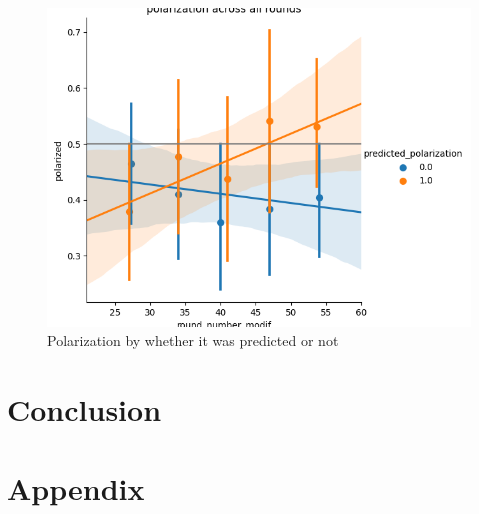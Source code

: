 \documentclass[
  12pt,
]{article}
\begin{document}
\begin{figure}

{\centering \includegraphics[width=0.65\linewidth]{../computed_objects/figures/polarization_rounds_predicted} 

}

\caption{\label{polarizationRounds} Polarization by whether it was predicted or not}\label{fig:polarizationRounds}
\end{figure}

\hypertarget{conclusion}{%
\section{Conclusion}\label{conclusion}}

\newpage
\appendix

\hypertarget{appendix}{%
\section{Appendix}\label{appendix}}

 
  \providecommand{\huxb}[2]{\arrayrulecolor[RGB]{#1}\global\arrayrulewidth=#2pt}
  \providecommand{\huxvb}[2]{\color[RGB]{#1}\vrule width #2pt}
  \providecommand{\huxtpad}[1]{\rule{0pt}{#1}}
  \providecommand{\huxbpad}[1]{\rule[-#1]{0pt}{#1}}
\end{document}
